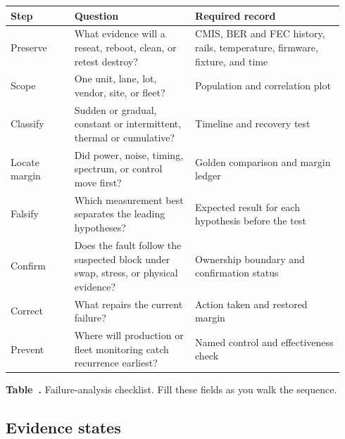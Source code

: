 \begin{table}[ht]
\label{tab:failure-analysis-checklist}%
\centering
\setlength{\tabcolsep}{4pt}%
\footnotesize
\renewcommand{\arraystretch}{1.25}%
\begin{tabular}{@{}p{0.18\linewidth}p{0.34\linewidth}p{0.42\linewidth}@{}}
\toprule
Step & Question & Required record \\
\midrule
Preserve & What evidence will a reseat, reboot, clean, or retest destroy? &
CMIS, BER and FEC history, rails, temperature, firmware, fixture, and time \\
\addlinespace[1.2em]
Scope & One unit, lane, lot, vendor, site, or fleet? &
Population and correlation plot \\
\addlinespace[1.2em]
Classify & Sudden or gradual, constant or intermittent, thermal or cumulative? &
Timeline and recovery test \\
\addlinespace[1.2em]
Locate margin & Did power, noise, timing, spectrum, or control move first? &
Golden comparison and margin ledger \\
\addlinespace[1.2em]
Falsify & Which measurement best separates the leading hypotheses? &
Expected result for each hypothesis before the test \\
\addlinespace[1.2em]
Confirm & Does the fault follow the suspected block under swap, stress, or
physical evidence? &
Ownership boundary and confirmation status \\
\addlinespace[1.2em]
Correct & What repairs the current failure? &
Action taken and restored margin \\
\addlinespace[1.2em]
Prevent & Where will production or fleet monitoring catch recurrence earliest? &
Named control and effectiveness check \\
\bottomrule
\end{tabular}
\par\medskip
{\raggedright\footnotesize\textbf{Table~\thetable.} Failure-analysis checklist.
Fill these fields as you walk the sequence.\par}
\end{table}
\FloatBarrier

\subsection{Evidence states}
\label{sec:fa-evidence-states}

